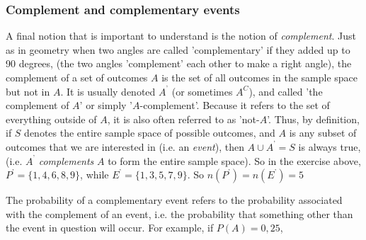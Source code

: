             \subsubsection{ Complement and complementary events}
            \nopagebreak
\label{m39377*eip-442}A final notion that is important to understand is the notion
of \textsl{complement}.
Just as in geometry when two angles are called 'complementary' if they added up
to 90 degrees, (the two angles 'complement' each other to make a right angle), the complement of a set of outcomes $A$ is the set of all outcomes in the sample space but not in \begin{math}A\end{math}. It is usually denoted
${A}^{\text{'}}$ (or sometimes \begin{math}{A}^{C}\end{math}), and called 'the complement of \begin{math}A\end{math}' or simply '\begin{math}A\end{math}-complement'. Because it refers to the set of everything outside of \begin{math}A\end{math}, it is also often referred to as 'not-\begin{math}A\end{math}'. Thus, by definition, if \begin{math}S\end{math} denotes the entire sample space of possible outcomes, and \begin{math}A\end{math} is any subset of outcomes that we are interested in (i.e. an \textsl{event}), then \begin{math}A\cup {A}^{\text{'}}=S\end{math} is always
true, (i.e. ${A}^{\text{'}}$ \textsl{complements} \begin{math}A\end{math} to form the entire
sample space). So in the exercise above, ${P}^{\text{'}}=\{1,4,6,8,9\}$,
while ${E}^{\text{'}}=\{1,3,5,7,9\}$. So \begin{math}n\left({P}^{\text{'}}\right)=n\left({E}^{\text{'}}\right)=5\end{math}\par \label{m39377*eip-324}The probability of a complementary event refers to the
probability associated with the complement of an event, i.e. the probability that something other than the event in question will occur. For example, if $P\left(A\right)=0,25$,

